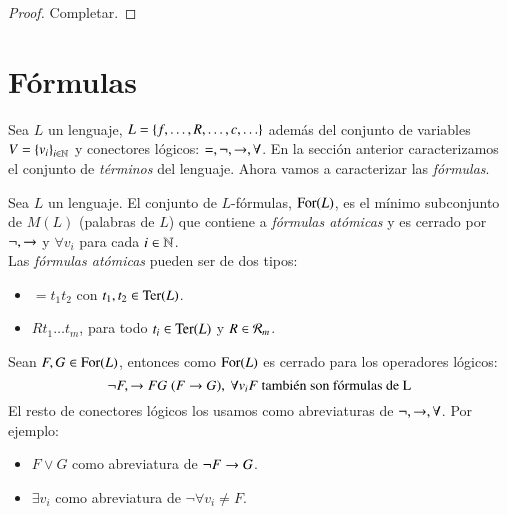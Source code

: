 \begin{proof}
    Completar.
\end{proof}

\section{F\'ormulas}

Sea $L$ un lenguaje, $L = \left\{f, \ldots, R, \ldots, c, \ldots\right\}$ además del conjunto de variables $V = \left\{v_i\right\}_{i \in \mathbb{N}}$ y conectores lógicos: $=, \neg, \rightarrow, \forall$. En la sección anterior caracterizamos el conjunto de \textit{términos} del lenguaje. Ahora vamos a caracterizar las \textit{fórmulas}.

\begin{dfn}
    Sea $L$ un lenguaje. El conjunto de $L$-fórmulas, $\mathrm{For}(L)$, es el mínimo subconjunto de $M(L)$ (palabras de $L$) que contiene a \textit{fórmulas atómicas} y es cerrado por $\neg, \rightarrow$ y $\forall v_i$ para cada $i \in \mathbb{N}$.\\

    Las \textit{fórmulas atómicas} pueden ser de dos tipos:
    \begin{itemize}
        \item $= t_1 t_2$ con $t_1, t_2 \in \mathrm{Ter}(L)$.
        \item $R t_1 \ldots t_m$, para todo $t_i \in \mathrm{Ter}(L)$ y $R \in \mathcal{R}_m$.
    \end{itemize}
\end{dfn}

\begin{obs}
    Sean $F, G \in \mathrm{For}(L)$, entonces como $\mathrm{For}(L)$ es cerrado para los operadores lógicos:
    $$
        \neg F, \rightarrow F G\ (F \rightarrow G),\ \forall v_i F \text{ también son fórmulas de L}
    $$
    El resto de conectores lógicos los usamos como abreviaturas de $\neg, \rightarrow, \forall$. Por ejemplo:
    \begin{itemize}
        \item $F \lor G$ como abreviatura de $\neg F \rightarrow G$.
        \item $\exists v_i$ como abreviatura de $\neg \forall v_i \neq F$.
    \end{itemize}
\end{obs}

